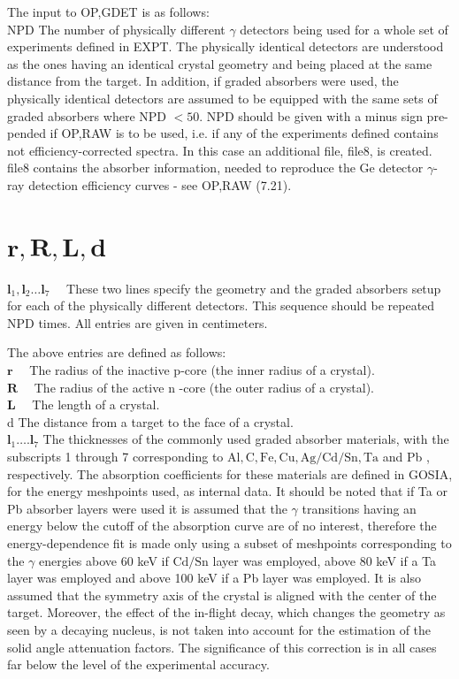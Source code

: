 \documentclass[10pt]{article}
\begin{document}
The input to OP,GDET is as follows:\\
NPD The number of physically different $\gamma$ detectors being used for a whole set of experiments defined in EXPT. The physically identical detectors are understood as the ones having an identical crystal geometry and being placed at the same distance from the target. In addition, if graded absorbers were used, the physically identical detectors are assumed to be equipped with the same sets of graded absorbers where NPD $<50$. NPD should be given with a minus sign pre-pended if OP,RAW is to be used, i.e. if any of the experiments defined contains not efficiency-corrected spectra. In this case an additional file, file8, is created. file8 contains the absorber information, needed to reproduce the Ge detector $\gamma$-ray detection efficiency curves - see OP,RAW (7.21).

\section*{$\mathbf{r}, \mathbf{R}, \mathbf{L}, \mathbf{d}$}
$\mathbf{l}_{1}, \mathbf{l}_{2} \ldots \mathbf{l}_{7} \quad$ These two lines specify the geometry and the graded absorbers setup for each of the physically different detectors. This sequence should be repeated NPD times. All entries are given in centimeters.

The above entries are defined as follows:\\
$\mathbf{r} \quad$ The radius of the inactive p-core (the inner radius of a crystal).\\
$\mathbf{R} \quad$ The radius of the active n -core (the outer radius of a crystal).\\
$\mathbf{L} \quad$ The length of a crystal.\\
d The distance from a target to the face of a crystal.\\
$\mathbf{l}_{1} \ldots . \mathbf{l}_{7}$ The thicknesses of the commonly used graded absorber materials, with the subscripts 1 through 7 corresponding to $\mathrm{Al}, \mathrm{C}, \mathrm{Fe}, \mathrm{Cu}, \mathrm{Ag} / \mathrm{Cd} / \mathrm{Sn}, \mathrm{Ta}$ and Pb , respectively. The absorption coefficients for these materials are defined in GOSIA, for the energy meshpoints used, as internal data. It should be noted that if Ta or Pb absorber layers were used it is assumed that the $\gamma$ transitions having an energy below the cutoff of the absorption curve are of no interest, therefore the energy-dependence fit is made only using a subset of meshpoints corresponding to the $\gamma$ energies above 60 keV if $\mathrm{Cd} / \mathrm{Sn}$ layer was employed, above 80 keV if a Ta layer was employed and above 100 keV if a Pb layer was employed. It is also assumed that the symmetry axis of the crystal is aligned with the center of the target. Moreover, the effect of the in-flight decay, which changes the geometry as seen by a decaying nucleus, is not taken into account for the estimation of the solid angle attenuation factors. The significance of this correction is in all cases far below the level of the experimental accuracy.
\end{document}
